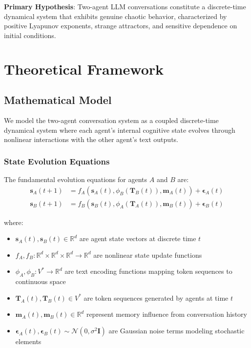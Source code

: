 \documentclass[11pt,a4paper]{article}
\begin{document}
\textbf{Primary Hypothesis}: Two-agent LLM conversations constitute a discrete-time dynamical system that exhibits genuine chaotic behavior, characterized by positive Lyapunov exponents, strange attractors, and sensitive dependence on initial conditions.

\section{Theoretical Framework}

\subsection{Mathematical Model}

We model the two-agent conversation system as a coupled discrete-time dynamical system where each agent's internal cognitive state evolves through nonlinear interactions with the other agent's text outputs.

\subsubsection{State Evolution Equations}

The fundamental evolution equations for agents $A$ and $B$ are:
\begin{align}
\mathbf{s}_A(t+1) &= f_A(\mathbf{s}_A(t), \phi_B(\mathbf{T}_B(t)), \mathbf{m}_A(t)) + \boldsymbol{\epsilon}_A(t) \label{eq:state_a} \\
\mathbf{s}_B(t+1) &= f_B(\mathbf{s}_B(t), \phi_A(\mathbf{T}_A(t)), \mathbf{m}_B(t)) + \boldsymbol{\epsilon}_B(t) \label{eq:state_b}
\end{align}

where:
\begin{itemize}
    \item $\mathbf{s}_A(t), \mathbf{s}_B(t) \in \mathbb{R}^d$ are agent state vectors at discrete time $t$
    \item $f_A, f_B: \mathbb{R}^d \times \mathbb{R}^d \times \mathbb{R}^d \rightarrow \mathbb{R}^d$ are nonlinear state update functions
    \item $\phi_A, \phi_B: V^* \rightarrow \mathbb{R}^d$ are text encoding functions mapping token sequences to continuous space
    \item $\mathbf{T}_A(t), \mathbf{T}_B(t) \in V^*$ are token sequences generated by agents at time $t$
    \item $\mathbf{m}_A(t), \mathbf{m}_B(t) \in \mathbb{R}^d$ represent memory influence from conversation history
    \item $\boldsymbol{\epsilon}_A(t), \boldsymbol{\epsilon}_B(t) \sim \mathcal{N}(0, \sigma^2 \mathbf{I})$ are Gaussian noise terms modeling stochastic elements
\end{itemize}
\end{document}
